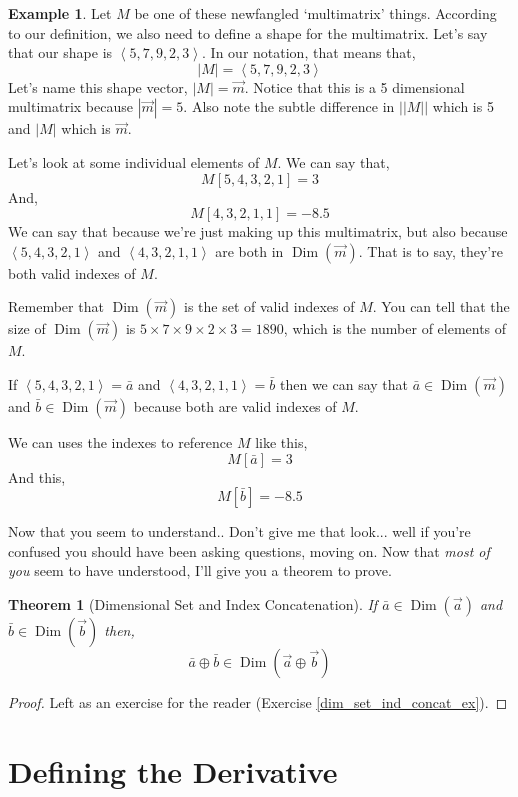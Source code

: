 \documentclass[12pt]{book}
\theoremstyle{plain}
\newtheorem{theorem}{Theorem}[chapter]
\theoremstyle{definition}
\newtheorem{example}{Example}[chapter]
\theoremstyle{ppart}
\theoremstyle{case}
\theoremstyle{solution}
\DeclareMathOperator{\Dim}{Dim}
\newcommand{\shape}[1]{\left|#1\right|}
\begin{document}
\begin{example}
Let $M$ be one of these newfangled `multimatrix' things. According to our
definition, we also need to define a shape for the multimatrix. Let's
say that our shape is $\left<5,7,9,2,3\right>$. In our notation, that
means that,
\[ \shape{M} = \left<5,7,9,2,3\right> \]
Let's name this shape vector, $\shape{M} = \vec{m}$. Notice that this is
a 5 dimensional multimatrix because $\shape{\vec{m}} = 5$. Also note the
subtle difference in $\shape{\shape{M}}$ which is 5 and $\shape{M}$ which is $\vec{m}$.

Let's look at some individual elements of $M$. We can say that,
\[ M[5,4,3,2,1] = 3 \]
And,
\[ M[4,3,2,1,1] = -8.5 \]
We can say that because we're just making up this multimatrix, but also
because $\left<5,4,3,2,1\right>$ and $\left<4,3,2,1,1\right>$
are both in $\Dim(\vec{m})$. That is to say, they're both valid
indexes of $M$.

Remember that $\Dim(\vec{m})$ is the set of valid indexes of $M$.
You can tell that the size of  $\Dim(\vec{m})$ is
$5 \times 7 \times 9 \times 2 \times 3 = 1890$, which is the number of
elements of $M$.

If $\left<5,4,3,2,1\right> = \bar{a}$ and $\left<4,3,2,1,1\right> = \bar{b}$
then we can say that $\bar{a} \in \Dim(\vec{m})$ and $\bar{b} \in \Dim(\vec{m})$
because both are valid indexes of $M$.

We can uses the indexes to reference $M$ like this,
\[ M[\bar{a}] = 3 \]
And this,
\[ M[\bar{b}] = -8.5 \]
\end{example}

Now that you seem to understand.. Don't give me that look... well if you're confused
you should have been asking questions, moving on. Now that \textit{most of you}
seem to have understood, I'll give you a theorem to prove.

\begin{theorem}[Dimensional Set and Index Concatenation]
\label{dim_set_ind_concat_thm}
If $\bar{a} \in \Dim(\vec{a})$ and $\bar{b} \in \Dim(\vec{b})$ then,
\[ \bar{a} \oplus \bar{b} \in \Dim(\vec{a} \oplus \vec{b}) \]
\end{theorem}
\begin{proof}
Left as an exercise for the reader (Exercise \ref{dim_set_ind_concat_ex}).
\end{proof}

\section{Defining the Derivative}
\end{document}
